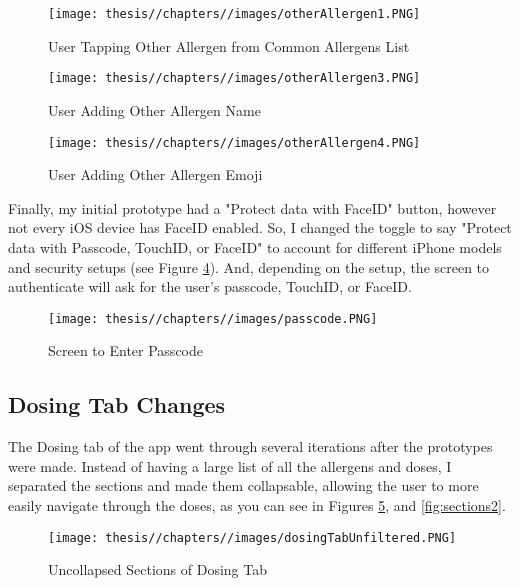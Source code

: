 \begin{figure} [H]
    \centering
    \texttt{[image: thesis//chapters//images/otherAllergen1.PNG]}
    \caption{User Tapping Other Allergen from Common Allergens List}
     \label{fig:other1}
\end{figure}

\begin{figure} [H]
    \centering
    \texttt{[image: thesis//chapters//images/otherAllergen3.PNG]}
    \caption{User Adding Other Allergen Name}
      \label{fig:other2}
\end{figure}

\begin{figure} [H]
    \centering
    \texttt{[image: thesis//chapters//images/otherAllergen4.PNG]}
    \caption{User Adding Other Allergen Emoji}
      \label{fig:other3}
\end{figure}

Finally, my initial prototype had a "Protect data with FaceID" button, however not every iOS device has FaceID enabled. So, I changed the toggle to say "Protect data with Passcode, TouchID, or FaceID" to account for different iPhone models and security setups (see Figure \ref{fig:passcode}). And, depending on the setup, the screen to authenticate will ask for the user's passcode, TouchID, or FaceID.

\begin{figure} [H]
    \centering
    \texttt{[image: thesis//chapters//images/passcode.PNG]}
    \caption{Screen to Enter Passcode}
       \label{fig:passcode}
\end{figure}

\subsection{Dosing Tab Changes}

The Dosing tab of the app went through several iterations after the prototypes were made. Instead of having a large list of all the allergens and doses, I separated the sections and made them collapsable, allowing the user to more easily navigate through the doses, as you can see in Figures \ref{fig:sections1}, and \ref{fig:sections2}.

\begin{figure} [H]
    \centering
    \texttt{[image: thesis//chapters//images/dosingTabUnfiltered.PNG]}
    \caption{Uncollapsed Sections of Dosing Tab}
        \label{fig:sections1}
\end{figure}

